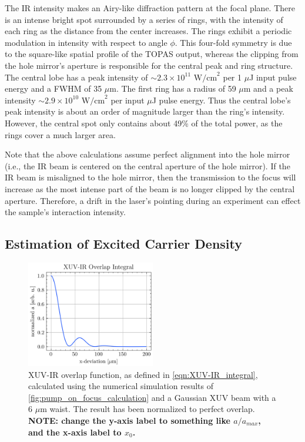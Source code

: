 The IR intensity makes an Airy-like diffraction pattern at the focal plane. There is an intense bright spot surrounded by a series of rings, with the intensity of each ring as the distance from the center increases. The rings exhibit a periodic modulation in intensity with respect to angle $\phi$. This four-fold symmetry is due to the square-like spatial profile of the TOPAS output, whereas the clipping from the hole mirror's aperture is responsible for the central peak and ring structure. The central lobe has a peak intensity of $\sim 2.3 \times 10^{11} \text{ W/cm}^2$ per 1 $\mu$J input pulse energy and a FWHM of 35 $\mu$m. The first ring has a radius of 59 $\mu$m and a peak intensity $\sim 2.9 \times 10^{10} \text{ W/cm}^2$ per input $\mu$J pulse energy. Thus the central lobe's peak intensity is about an order of magnitude larger than the ring's intensity. However, the central spot only contains about 49\% of the total power, as the rings cover a much larger area.

Note that the above calculations assume perfect alignment into the hole mirror (i.e., the IR beam is centered on the central aperture of the hole mirror). If the IR beam is misaligned to the hole mirror, then the transmission to the focus will increase as the most intense part of the beam is no longer clipped by the central aperture. Therefore, a drift in the laser's pointing during an experiment can effect the sample's interaction intensity.

\subsection{Estimation of Excited Carrier Density}
\label{sec:Excited_Carrier_Density}

\begin{figure}
	\centering
	\includegraphics[width=0.5\textwidth]{figures/chap3/XUV-IR_overlap_integral.png}
	\caption{XUV-IR overlap function, as defined in \cref{eqn:XUV-IR_integral}, calculated using the numerical simulation results of \cref{fig:pump_on_focus_calculation} and a Gaussian XUV beam with a 6 $\mu$m waist. The result has been normalized to perfect overlap. \textbf{NOTE: change the y-axis label to something like $a / a_{max}$, and the x-axis label to $x_0$.}}
	\label{fig:XUV-IR_integral}
\end{figure}

